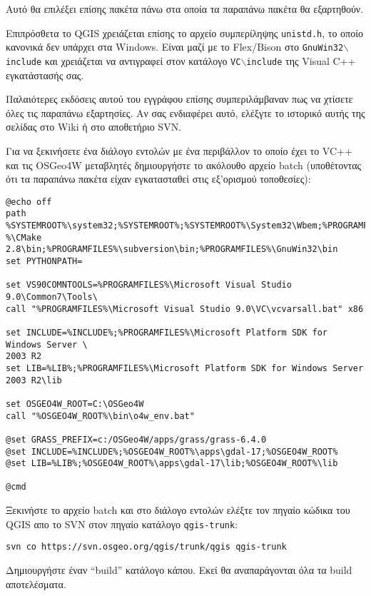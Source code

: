 Αυτό θα επιλέξει επίσης πακέτα πάνω στα οποία τα παραπάνω πακέτα θα εξαρτηθούν.

Επιπρόσθετα το QGIS χρειάζεται επίσης το αρχείο συμπερίληψης \texttt{unistd.h}, το οποίο κανονικά δεν υπάρχει στα Windows. Είναι μαζί με το Flex/Bison στο \texttt{GnuWin32$\backslash$include} και χρειάζεται να αντιγραφεί στον κατάλογο \texttt{VC$\backslash$include} της Visual C++ εγκατάστασής σας.

Παλαιότερες εκδόσεις αυτού του εγγράφου επίσης συμπεριλάμβαναν πως να χτίσετε όλες τις παραπάνω εξαρτησίες. Αν σας ενδιαφέρει αυτό, ελέξγτε το ιστορικό αυτής της σελίδας στο Wiki ή στο αποθετήριο SVN.

Για να ξεκινήσετε ένα διάλογο εντολών με ένα περιβάλλον το οποίο έχει το VC++ και τις  OSGeo4W μεταβλητές δημιουργήστε το ακόλουθο αρχείο batch (υποθέτοντας ότι τα παραπάνω πακέτα είχαν εγκατασταθεί στις εξ'ορισμού τοποθεσίες): 

\begin{verbatim}
@echo off
path %SYSTEMROOT%\system32;%SYSTEMROOT%;%SYSTEMROOT%\System32\Wbem;%PROGRAMFILES\
%\CMake 2.8\bin;%PROGRAMFILES%\subversion\bin;%PROGRAMFILES%\GnuWin32\bin
set PYTHONPATH=

set VS90COMNTOOLS=%PROGRAMFILES%\Microsoft Visual Studio 9.0\Common7\Tools\
call "%PROGRAMFILES%\Microsoft Visual Studio 9.0\VC\vcvarsall.bat" x86

set INCLUDE=%INCLUDE%;%PROGRAMFILES%\Microsoft Platform SDK for Windows Server \
2003 R2
set LIB=%LIB%;%PROGRAMFILES%\Microsoft Platform SDK for Windows Server 2003 R2\lib

set OSGEO4W_ROOT=C:\OSGeo4W
call "%OSGEO4W_ROOT%\bin\o4w_env.bat"

@set GRASS_PREFIX=c:/OSGeo4W/apps/grass/grass-6.4.0
@set INCLUDE=%INCLUDE%;%OSGEO4W_ROOT%\apps\gdal-17;%OSGEO4W_ROOT%
@set LIB=%LIB%;%OSGEO4W_ROOT%\apps\gdal-17\lib;%OSGEO4W_ROOT%\lib

@cmd
\end{verbatim}

Ξεκινήστε το αρχείο batch και στο διάλογο εντολών ελέξτε τον πηγαίο κώδικα του QGIS απο το SVN στον πηγαίο κατάλογο \texttt{qgis-trunk}:

\begin{verbatim}
svn co https://svn.osgeo.org/qgis/trunk/qgis qgis-trunk
\end{verbatim}

Δημιουργήστε έναν “build” κατάλογο κάπου. Εκεί θα αναπαράγονται όλα τα build αποτελέσματα.

